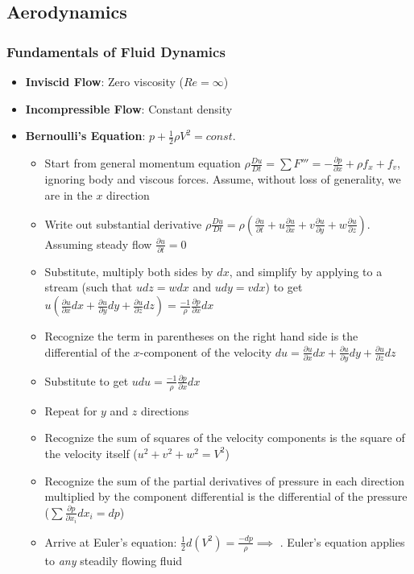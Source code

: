 \documentclass[11pt]{article}
\newcommand{\Item}[1]{\item \textbf{#1}:}
\begin{document}
\subsection{Aerodynamics}
\subsubsection{Fundamentals of Fluid Dynamics}
\begin{itemize}
\Item{Inviscid Flow} Zero viscosity ($Re = \infty$)
\Item{Incompressible Flow} Constant density
\Item{Bernoulli's Equation} $p + \frac{1}{2}\rho V^2 = const.$\\
	\begin{itemize}
	\item Start from general momentum equation $\rho\frac{Du}{Dt} = \sum F''' = -\frac{\partial p}{\partial x}+ \rho f_x + f_v$, ignoring body and viscous forces. Assume, without loss of generality, we are in the $x$ direction
	\item Write out substantial derivative $\rho\frac{Du}{Dt} = \rho\left(\frac{\partial u}{\partial t} + u\frac{\partial u}{\partial x} + v\frac{\partial u}{\partial y} + w\frac{\partial u}{\partial z}\right)$. Assuming steady flow $\frac{\partial u}{\partial t} = 0$
	\item Substitute, multiply both sides by $dx$, and simplify by applying to a stream (such that $udz=wdx$ and $udy=vdx$) to get $u\left(\frac{\partial u}{\partial x}dx+\frac{\partial u}{\partial y}dy+\frac{\partial u}{\partial z}dz\right)=\frac{-1}{\rho}\frac{\partial p}{\partial x}dx$
	\item Recognize the term in parentheses on the right hand side is the differential of the $x$-component of the velocity $du = \frac{\partial u}{\partial x}dx+\frac{\partial u}{\partial y}dy+\frac{\partial u}{\partial z}dz$
	\item Substitute to get $udu = \frac{-1}{\rho}\frac{\partial p}{\partial x}dx$
	\item Repeat for $y$ and $z$ directions
	\item Recognize the sum of squares of the velocity components is the square of the velocity itself ($u^2+v^2+w^2=V^2$)
	\item Recognize the sum of the partial derivatives of pressure in each direction multiplied by the component differential is the differential of the pressure ($\sum\frac{\partial p}{\partial x_i}dx_i = dp$)
	\item Arrive at Euler's equation: $\frac{1}{2}d(V^2) = \frac{-dp}{\rho}\implies$ . Euler's equation applies to \textit{any} steadily flowing fluid

\end{itemize}
\end{itemize}
\end{document}
